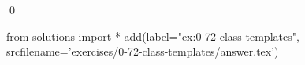 
\begin{ex}
  \label{ex:0-72-class-templates}
  
  \qed
\end{ex}
\begin{python0}
from solutions import *
add(label="ex:0-72-class-templates",
    srcfilename='exercises/0-72-class-templates/answer.tex')
\end{python0}
